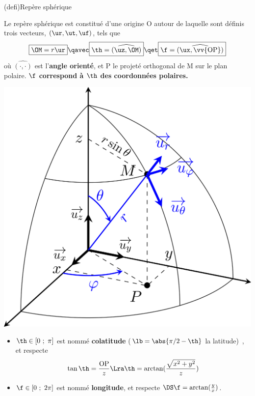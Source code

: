 \documentclass[../../main/main.tex]{subfiles}
\begin{document}
\begin{tcb*}(defi){Repère sphérique}
	\begin{isd}[righthand ratio=.28]
		Le repère sphérique est constitué d'une origine O autour de laquelle sont
		définis trois vecteurs, $(\ur, \ut, \uf)$, tels que
		\[\boxed{\OM = r\ur}
			\qavec
			\boxed{\th = \widehat{(\uz,\OM)}}
			\qet
			\boxed{\f = \widehat{(\ux,\vv{\rm OP})}}
		\]
		où $\widehat{(\cdot, \cdot)}$ est l'\textbf{angle orienté}, et P le
		projeté orthogonal de M sur le plan polaire. \textbf{$\mathbf{\f}$
			correspond à $\th$ des coordonnées polaires.}
		\tcblower
		\begin{center}
			\includegraphics[width=\linewidth]{sph_rep}
			\captionsetup{justification=centering}
		\end{center}
	\end{isd}
	\begin{itemize}[itemsep=-5pt]
		\item $\th \in [0~;~\pi]$ est nommé \textbf{colatitude} ($\lb =
		      \abs{\pi/2 - \th}$ la latitude)~, et respecte
		      \[  \tan\th
			      = \frac{\rm OP}{z}
			      \Lra \th
			      = \arctan(\frac{\sqrt{x^2 + y^2}}{z})
		      \]
		\item $\f \in [0~;~2\pi]$ est nommé \textbf{longitude}, et respecte $\DS
			      \f = \arctan(\frac{y}{x})$.
	\end{itemize}
\end{tcb*}
\end{document}

